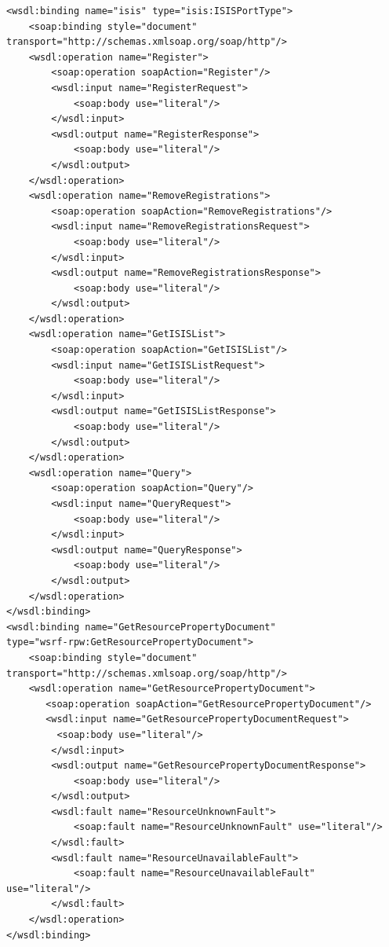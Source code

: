 \documentclass{book}
\begin{document}
\begin{verbatim}
<wsdl:binding name="isis" type="isis:ISISPortType">
    <soap:binding style="document" transport="http://schemas.xmlsoap.org/soap/http"/>
    <wsdl:operation name="Register">
        <soap:operation soapAction="Register"/>
        <wsdl:input name="RegisterRequest">
            <soap:body use="literal"/>
        </wsdl:input>
        <wsdl:output name="RegisterResponse">
            <soap:body use="literal"/>
        </wsdl:output>
    </wsdl:operation>
    <wsdl:operation name="RemoveRegistrations">
        <soap:operation soapAction="RemoveRegistrations"/>
        <wsdl:input name="RemoveRegistrationsRequest">
            <soap:body use="literal"/>
        </wsdl:input>
        <wsdl:output name="RemoveRegistrationsResponse">
            <soap:body use="literal"/>
        </wsdl:output>
    </wsdl:operation>
    <wsdl:operation name="GetISISList">
        <soap:operation soapAction="GetISISList"/>
        <wsdl:input name="GetISISListRequest">
            <soap:body use="literal"/>
        </wsdl:input>
        <wsdl:output name="GetISISListResponse">
            <soap:body use="literal"/>
        </wsdl:output>
    </wsdl:operation>
    <wsdl:operation name="Query">
        <soap:operation soapAction="Query"/>
        <wsdl:input name="QueryRequest">
            <soap:body use="literal"/>
        </wsdl:input>
        <wsdl:output name="QueryResponse">
            <soap:body use="literal"/>
        </wsdl:output>
    </wsdl:operation>
</wsdl:binding>
<wsdl:binding name="GetResourcePropertyDocument" 
type="wsrf-rpw:GetResourcePropertyDocument">
    <soap:binding style="document" transport="http://schemas.xmlsoap.org/soap/http"/>
    <wsdl:operation name="GetResourcePropertyDocument">
       <soap:operation soapAction="GetResourcePropertyDocument"/>
       <wsdl:input name="GetResourcePropertyDocumentRequest">
         <soap:body use="literal"/>
        </wsdl:input>
        <wsdl:output name="GetResourcePropertyDocumentResponse">
            <soap:body use="literal"/>
        </wsdl:output>
        <wsdl:fault name="ResourceUnknownFault">
            <soap:fault name="ResourceUnknownFault" use="literal"/>
        </wsdl:fault>
        <wsdl:fault name="ResourceUnavailableFault">
            <soap:fault name="ResourceUnavailableFault" use="literal"/>
        </wsdl:fault>
    </wsdl:operation>
</wsdl:binding>


\end{verbatim}
\end{document}
